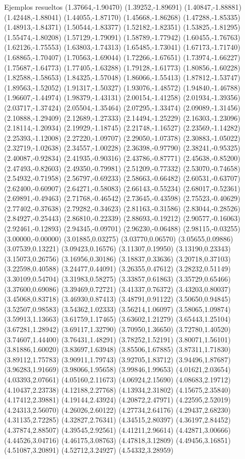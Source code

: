 \documentclass[11pt,a4paper]{article}
\begin{document}
\begin{fmex}{Ejemplos resueltos}
(1.37664,-1.90470) (1.39252,-1.89691) (1.40847,-1.88881) (1.42448,-1.88041) (1.44055,-1.87170) (1.45668,-1.86268) (1.47288,-1.85335) (1.48913,-1.84371) (1.50544,-1.83377) (1.52182,-1.82351) (1.53825,-1.81295) (1.55474,-1.80208) (1.57129,-1.79091) (1.58789,-1.77942) (1.60455,-1.76763) (1.62126,-1.75553) (1.63803,-1.74313) (1.65485,-1.73041) (1.67173,-1.71740) (1.68865,-1.70407) (1.70563,-1.69044) (1.72266,-1.67651) (1.73974,-1.66227) (1.75687,-1.64773) (1.77405,-1.63288) (1.79128,-1.61773) (1.80856,-1.60228) (1.82588,-1.58653) (1.84325,-1.57048) (1.86066,-1.55413) (1.87812,-1.53747) (1.89563,-1.52052) (1.91317,-1.50327) (1.93076,-1.48572) (1.94840,-1.46788) (1.96607,-1.44974) (1.98379,-1.43131) (2.00154,-1.41258) (2.01934,-1.39356) (2.03717,-1.37424) (2.05504,-1.35464) (2.07295,-1.33474) (2.09089,-1.31456) (2.10888,-1.29409) (2.12689,-1.27333) (2.14494,-1.25229) (2.16303,-1.23096) (2.18114,-1.20934) (2.19929,-1.18745) (2.21748,-1.16527) (2.23569,-1.14282) (2.25393,-1.12008) (2.27220,-1.09707) (2.29050,-1.07378) (2.30883,-1.05022) (2.32719,-1.02638) (2.34557,-1.00228) (2.36398,-0.97790) (2.38241,-0.95325) (2.40087,-0.92834) (2.41935,-0.90316) (2.43786,-0.87771) (2.45638,-0.85200) (2.47493,-0.82603) (2.49350,-0.79981) (2.51209,-0.77332) (2.53070,-0.74658) (2.54932,-0.71958) (2.56797,-0.69233) (2.58663,-0.66482) (2.60531,-0.63707) (2.62400,-0.60907) (2.64271,-0.58083) (2.66143,-0.55234) (2.68017,-0.52361) (2.69891,-0.49463) (2.71768,-0.46542) (2.73645,-0.43598) (2.75523,-0.40629) (2.77402,-0.37638) (2.79282,-0.34623) (2.81163,-0.31586) (2.83044,-0.28526) (2.84927,-0.25443) (2.86810,-0.22339) (2.88693,-0.19212) (2.90577,-0.16063) (2.92461,-0.12893) (2.94345,-0.09701) (2.96230,-0.06488) (2.98115,-0.03255) (3.00000,-0.00000) (3.01885,0.03275) (3.03770,0.06570) (3.05655,0.09886) (3.07539,0.13221) (3.09423,0.16576) (3.11307,0.19950) (3.13190,0.23343) (3.15073,0.26756) (3.16956,0.30186) (3.18837,0.33636) (3.20718,0.37103) (3.22598,0.40588) (3.24477,0.44091) (3.26355,0.47612) (3.28232,0.51149) (3.30109,0.54704) (3.31983,0.58275) (3.33857,0.61863) (3.35729,0.65466) (3.37600,0.69086) (3.39469,0.72721) (3.41337,0.76372) (3.43203,0.80037) (3.45068,0.83718) (3.46930,0.87413) (3.48791,0.91122) (3.50650,0.94845) (3.52507,0.98583) (3.54362,1.02333) (3.56214,1.06097) (3.58065,1.09874) (3.59913,1.13663) (3.61759,1.17465) (3.63602,1.21279) (3.65443,1.25104) (3.67281,1.28942) (3.69117,1.32790) (3.70950,1.36650) (3.72780,1.40520) (3.74607,1.44400) (3.76431,1.48291) (3.78252,1.52191) (3.80071,1.56101) (3.81886,1.60020) (3.83697,1.63948) (3.85506,1.67885) (3.87311,1.71830) (3.89112,1.75783) (3.90911,1.79743) (3.92705,1.83712) (3.94496,1.87687) (3.96283,1.91669) (3.98066,1.95658) (3.99846,1.99653) (4.01621,2.03654) (4.03393,2.07661) (4.05160,2.11673) (4.06924,2.15690) (4.08683,2.19712) (4.10437,2.23738) (4.12188,2.27768) (4.13934,2.31802) (4.15675,2.35840) (4.17412,2.39881) (4.19144,2.43924) (4.20872,2.47971) (4.22595,2.52019) (4.24313,2.56070) (4.26026,2.60122) (4.27734,2.64176) (4.29437,2.68230) (4.31135,2.72285) (4.32827,2.76341) (4.34515,2.80397) (4.36197,2.84452) (4.37874,2.88507) (4.39545,2.92561) (4.41211,2.96614) (4.42871,3.00666) (4.44526,3.04716) (4.46175,3.08763) (4.47818,3.12809) (4.49456,3.16851) (4.51087,3.20891) (4.52712,3.24927) (4.54332,3.28959) 
\end{fmex}
\end{document}
